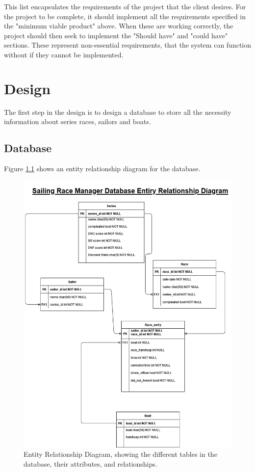 \documentclass{l4proj}
\begin{document}
This list encapsulates the requirements of the project that the client desires. For the project to be complete, it should implement all the requirements specified in the "minimum viable product" above. When these are working correctly, the project should then seek to implement the "Should have" and "could have" sections. These represent non-essential requirements, that the system can function without if they cannot be implemented.

\chapter{Design}
The first step in the design is to design a database to store all the necessity information about series races, sailors and boats.
\section{Database}

Figure \ref{fig:ERD} shows an entity relationship diagram for the database. 

\begin{figure}[H]
    \centering
    \includegraphics[width=0.75\linewidth]{images/ERD FINAL.png} 

    \caption{Entity Relationship Diagram, showing the different tables in the database, their attributes, and relationships.
    }

    \label{fig:ERD}
\end{figure}
\end{document}
